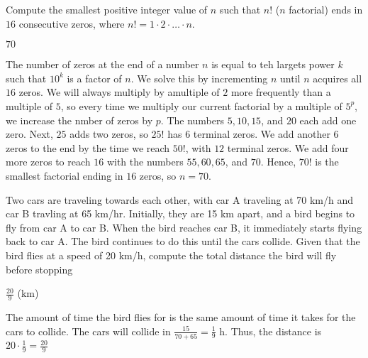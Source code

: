 \documentclass[11pt]{article}
\begin{document}
\begin{problem}%
Compute the smallest positive integer value of $n$ such that $n!$ ($n$ factorial) ends in $16$ consecutive zeros, where $n! = 1 \cdot 2 \cdot \ldots \cdot n$.
\end{problem}

\begin{answer}
$\boxed{70}$
\end{answer}

\begin{solution}
The number of zeros at the end of a number $n$ is equal to teh largets power $k$ such that $10^k$ is a factor of $n$. We solve this by incrementing $n$ until $n$ acquires all $16$ zeros. We will always multiply by amultiple of $2$ more frequently than a multiple of $5$, so every time we multiply our current factorial by a multiple of $5^p$, we increase the nmber of zeros by $p$. The numbers $5, 10, 15$, and $20$ each add one zero. Next, $25$ adds two zeros, so $25!$ has 6 terminal zeros. We add another $6$ zeros to the end by the time we reach $50!$, with $12$ terminal zeros. We add four more zeros to reach $16$ with the numbers $55, 60, 65$, and $70$. Hence, $70!$ is the smallest factorial ending in $16$ zeros, so $n = \boxed{70}$.
\end{solution}


\begin{problem}%
Two cars are traveling towards each other, with car A traveling at 70 km/h and car B travling at 65 km/hr. Initially, they are 15 km apart, and a bird begins to fly from car A to car B. When the bird reaches car B, it immediately starts flying back to car A. The bird continues to do this until the cars collide. Given that the bird flies at a speed of 20 km/h, compute the total distance the bird will fly before stopping
\end{problem}

\begin{answer}
$\boxed{\frac{20}{9}}$ (km)
\end{answer}

\begin{solution}
The amount of time the bird flies for is the same amount of time it takes for the cars to collide. The cars will collide in $\frac{15}{70+65}= \frac{1}{9}$ h. Thus, the distance is $20 \cdot \frac{1}{9} = \boxed{\frac{20}{9}}$
\end{solution}
\end{document}
